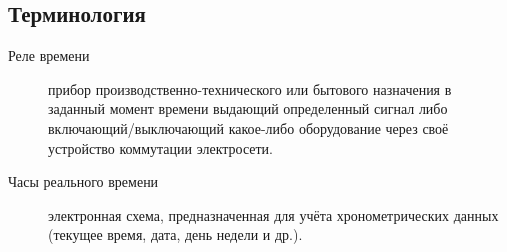 \subsection{Терминология}
\begin{description}

\item[Реле времени]
прибор производственно-технического или бытового назначения в заданный момент времени выдающий определенный сигнал либо включающий/выключающий какое-либо оборудование через своё устройство коммутации электросети.  

\item[Часы реального времени]
электронная схема, предназначенная для учёта хронометрических данных (текущее время, дата, день недели и др.).

\end{description}


